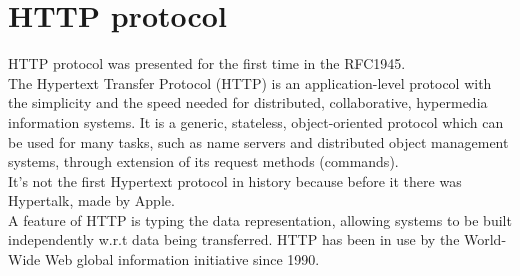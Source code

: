 \chapter{HTTP protocol}
HTTP protocol was presented for the first time in the RFC1945\cite{RFC1945}.\\
The Hypertext Transfer Protocol (HTTP) is an application-level protocol with the simplicity and the speed needed for distributed, collaborative, hypermedia information systems. It is a generic, stateless, object-oriented protocol which can be used for many tasks, such as name servers and distributed object management systems, through extension of its request methods (commands).\\
It's not the first Hypertext protocol in history because before it there was Hypertalk, made by Apple. \\
A feature of HTTP is typing the data representation, allowing systems to be built independently w.r.t data being transferred. HTTP has been in use by the World-Wide Web global information initiative since 1990.

